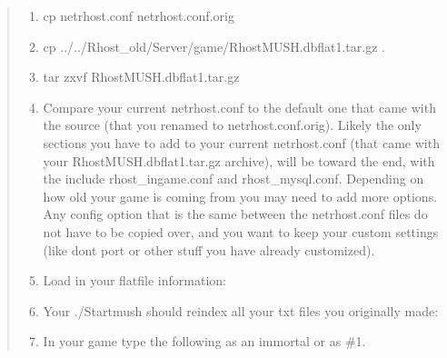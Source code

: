 \documentclass[letterpaper,10pt,english]{sphinxmanual}
\begin{document}
\begin{quote}
\begin{enumerate}
%
\item {} 
\sphinxAtStartPar
cp netrhost.conf netrhost.conf.orig

\item {} 
\sphinxAtStartPar
cp ../../Rhost\_old/Server/game/RhostMUSH.dbflat1.tar.gz .

\item {} 
\sphinxAtStartPar
tar \sphinxhyphen{}zxvf RhostMUSH.dbflat1.tar.gz

\item {} 
\sphinxAtStartPar
Compare your current netrhost.conf to the default one that came with the source (that you renamed to netrhost.conf.orig).  Likely the only sections you have to add to your current netrhost.conf (that came with your RhostMUSH.dbflat1.tar.gz archive), will be toward the end, with the include rhost\_ingame.conf and rhost\_mysql.conf.  Depending on how old your game is coming from you may need to add more options.  Any config option that is the same between the netrhost.conf files do not have to be copied over, and you want to keep your custom settings (like don\textquotesingle{}t port or other stuff you have already customized).

\item {} 
\sphinxAtStartPar
Load in your flatfile information:

\begin{sphinxVerbatim}[commandchars=\\\{\}]
   
\end{sphinxVerbatim}

\item {} 
\sphinxAtStartPar
Your ./Startmush should re\sphinxhyphen{}index all your txt files you originally made:

\begin{sphinxVerbatim}[commandchars=\\\{\}]
\end{sphinxVerbatim}

\item {} 
\sphinxAtStartPar
In your game type the following as an immortal or as \#1.


\end{enumerate}
\end{quote}
\end{document}
